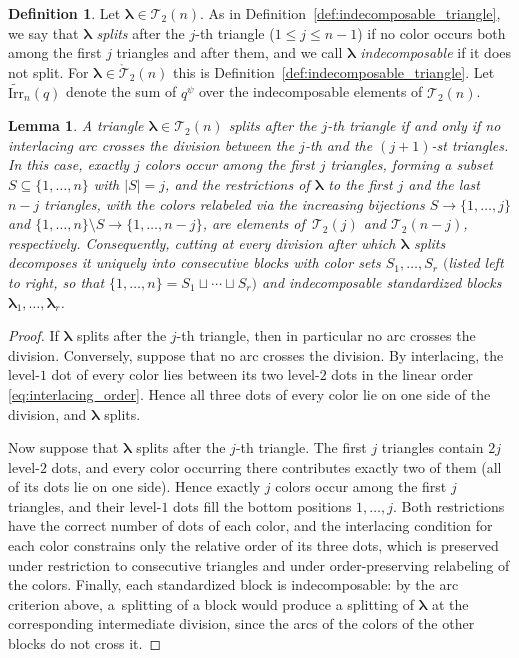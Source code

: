\documentclass[pdftex]{sigma}
\numberwithin{equation}{section}
\newtheorem{Lemma}[Theorem]{Lemma}
\theoremstyle{definition}
\newtheorem{Definition}[Theorem]{Definition}
\begin{document}
\begin{Definition}
	\label{def:indecomposable_general}
	Let $\boldsymbol\lambda\in\mathcal{T}_2(n)$.
	As in Definition~\ref{def:indecomposable_triangle}, we say that
	$\boldsymbol\lambda$ \emph{splits} after the $j$-th triangle
	($1\le j\le n-1$) if no color occurs both among the first $j$ triangles
	and after them, and we call $\boldsymbol\lambda$ \emph{indecomposable}
	if it does not split.
	For $\boldsymbol\lambda\in\mathring{\mathcal{T}}_2(n)$ this is
	Definition~\ref{def:indecomposable_triangle}.
	Let $\widetilde{\mathrm{Irr}}_n(q)$ denote the sum of $q^{\psi}$ over
	the indecomposable elements of $\mathcal{T}_2(n)$.
\end{Definition}

\begin{Lemma}
	\label{lem:splitting_structure}
	A triangle $\boldsymbol\lambda\in\mathcal{T}_2(n)$ splits after the
	$j$-th triangle if and only if no interlacing arc crosses the division
	between the $j$-th and the $(j+1)$-st triangles.
	In this case, exactly $j$ colors occur among the first $j$ triangles,
	forming a subset $S\subseteq\{1,\dots,n\}$ with $|S|=j$, and the
	restrictions of $\boldsymbol\lambda$ to the first $j$ and the last
	$n-j$ triangles, with the colors relabeled via the increasing
	bijections $S\to\{1,\dots,j\}$ and
	$\{1,\dots,n\}\setminus S\to\{1,\dots,n-j\}$, are elements of~$\mathcal{T}_2(j)$ and $\mathcal{T}_2(n-j)$, respectively.
	Consequently, cutting at every division after which
	$\boldsymbol\lambda$ splits decomposes it uniquely into consecutive
	blocks with color sets $S_1,\dots,S_r$ $($listed left to right, so that
	$\{1,\dots,n\}=S_1\sqcup\cdots\sqcup S_r)$ and indecomposable
	standardized blocks $\boldsymbol\lambda_1,\dots,\boldsymbol\lambda_r$.
\end{Lemma}
\begin{proof}
	If $\boldsymbol\lambda$ splits after the $j$-th triangle, then in
	particular no arc crosses the division.
	Conversely, suppose that no arc crosses the division.
	By interlacing, the level-$1$ dot of every color lies between its two
	level-$2$ dots in the linear order \eqref{eq:interlacing_order}. Hence
	all three dots of every color lie on one side of the division, and
	$\boldsymbol\lambda$ splits.

	Now suppose that $\boldsymbol\lambda$ splits after the $j$-th
	triangle.
	The first $j$ triangles contain $2j$ level-$2$ dots, and every color
	occurring there contributes exactly two of them (all of its dots lie on
	one side). Hence exactly $j$ colors occur among the first $j$
	triangles, and their level-$1$ dots fill the bottom positions
	$1,\dots,j$.
	Both restrictions have the correct number of dots of each color, and
	the interlacing condition for each color constrains only the relative
	order of its three dots, which is preserved under restriction to
	consecutive triangles and under order-preserving relabeling of the
	colors.
	Finally, each standardized block is indecomposable: by the arc
	criterion above, a~splitting of a block would produce a splitting of
	$\boldsymbol\lambda$ at the corresponding intermediate division, since
	the arcs of the colors of the other blocks do not cross it.
\end{proof}
\end{document}
